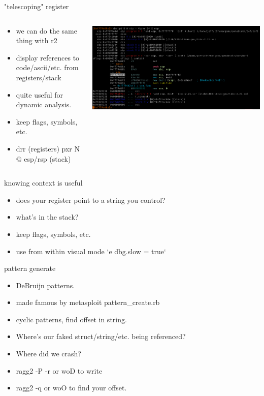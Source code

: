 \documentclass[10pt,pdf,utf8,english,compress,hyperref={unicode}]{beamer}
\begin{document}
\begin{frame}{"telescoping" register}
	\begin{columns}
		\begin{column}{.3\textwidth}
			\begin{itemize}
				\item we can do the same thing with r2
				\item display references to code/ascii/etc. from registers/stack
				\item quite useful for dynamic analysis.
				\item keep flags, symbols, etc.
				\item drr (registers) pxr N @ esp/rsp (stack)
			\end{itemize}
		\end{column}
		\begin{column}{.7\textwidth}
			\includegraphics[width=\textwidth]{cr_images/r2_context1.png}
		\end{column}
	\end{columns}
\end{frame}

\begin{frame}{knowing context is useful}
	\begin{itemize}
		\item does your register point to a string you control?
		\item what's in the stack?
		\item keep flags, symbols, etc.
		\item use from within visual mode `e dbg.slow = true`
	\end{itemize}
\end{frame}

\begin{frame}{pattern generate}
	\begin{itemize}
		\item DeBruijn patterns.
		\item made famous by metasploit pattern\_create.rb
		\item cyclic patterns, find offset in string.
		\item Where's our faked struct/string/etc. being referenced?
		\item Where did we crash?
		\item ragg2 -P -r or woD to write
		\item ragg2 -q or woO to find your offset.
	\end{itemize}
\end{frame}
\end{document}
